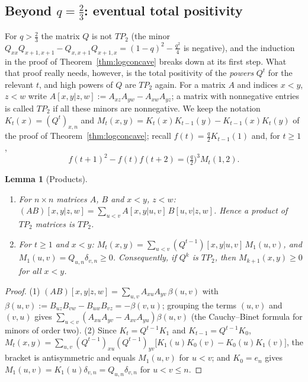 \documentclass[11pt,a4paper]{article}
\newtheorem{lemma}[theorem]{Lemma}
\theoremstyle{definition}
\theoremstyle{remark}
\begin{document}
\subsection{Beyond \texorpdfstring{$q=\frac23$}{q=2/3}: eventual total positivity}

For $q>\frac23$ the matrix $Q$ is not $TP_2$ (the minor $Q_{xx}Q_{x+1,x+1}-Q_{x,x+1}Q_{x+1,x}=(1-q)^2-\frac{q^2}4$ is
negative), and the induction in the proof of Theorem~\ref{thm:logconcave} breaks down at its first step. What
that proof really needs, however, is the total positivity of the \emph{powers} $Q^{t}$ for the relevant $t$, and
high powers of $Q$ are $TP_2$ again. For a matrix $A$ and indices $x<y$, $z<w$ write
$A[x,y|z,w]:=A_{xz}A_{yw}-A_{xw}A_{yz}$; a matrix with nonnegative entries is called $TP_2$ if all these minors are
nonnegative. We keep the notation $K_t(x)=(Q^t)_{x,n}$ and $M_t(x,y)=K_t(x)K_{t-1}(y)-K_{t-1}(x)K_t(y)$ of the proof of
Theorem~\ref{thm:logconcave}; recall $f(t)=\frac q2K_{t-1}(1)$ and, for $t\ge1$,
\begin{equation}\label{eq:M12}
   f(t+1)^2-f(t)f(t+2)=\bigl(\tfrac q2\bigr)^3M_t(1,2) .
\end{equation}

\begin{lemma}[Products]\label{lem:cb}
\begin{enumerate}
\item For $n\times n$ matrices $A$, $B$ and $x<y$, $z<w$: $(AB)[x,y|z,w]=\sum_{u<v}A[x,y|u,v]\,B[u,v|z,w]$. Hence a
product of $TP_2$ matrices is $TP_2$.
\item For $t\ge1$ and $x<y$: $M_t(x,y)=\sum_{u<v}(Q^{t-1})[x,y|u,v]\,M_1(u,v)$, and $M_1(u,v)=Q_{u,n}\delta_{v,n}\ge0$.
Consequently, if $Q^{k}$ is $TP_2$, then $M_{k+1}(x,y)\ge0$ for all $x<y$.
\end{enumerate}
\end{lemma}
\begin{proof}
(1) $(AB)[x,y|z,w]=\sum_{u,v}A_{xu}A_{yv}\,\beta(u,v)$ with $\beta(u,v):=B_{uz}B_{vw}-B_{uw}B_{vz}=-\beta(v,u)$; grouping
the terms $(u,v)$ and $(v,u)$ gives $\sum_{u<v}(A_{xu}A_{yv}-A_{xv}A_{yu})\beta(u,v)$ (the Cauchy--Binet formula for
minors of order two). (2) Since $K_t=Q^{t-1}K_1$ and $K_{t-1}=Q^{t-1}K_0$,
$M_t(x,y)=\sum_{u,v}(Q^{t-1})_{xu}(Q^{t-1})_{yv}\bigl[K_1(u)K_0(v)-K_0(u)K_1(v)\bigr]$, the bracket is antisymmetric and
equals $M_1(u,v)$ for $u<v$; and $K_0=e_n$ gives $M_1(u,v)=K_1(u)\delta_{v,n}=Q_{u,n}\delta_{v,n}$ for $u<v\le n$.
\end{proof}
\end{document}
